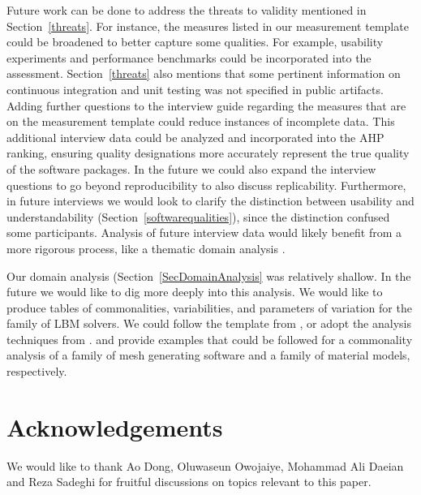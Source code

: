 \documentclass[final, 3p, times, authoryear]{elsarticle}
\begin{document}
Future work can be done to address the threats to validity mentioned in
Section~\ref{threats}.  For instance, the measures listed in our measurement
template could be broadened to better capture some qualities. For example,
usability experiments and performance benchmarks could be incorporated into the
assessment.  Section~\ref{threats} also mentions that some pertinent information
on continuous integration and unit testing was not specified in public
artifacts. Adding further questions to the interview guide regarding the
measures that are on the measurement template could reduce instances of
incomplete data. This additional interview data could be analyzed and
incorporated into the AHP ranking, ensuring quality designations more accurately
represent the true quality of the software packages. In the future we could also
expand the interview questions to go beyond reproducibility to also discuss
replicability. Furthermore, in future interviews we would look to clarify the
distinction between usability and understandability
(Section~\ref{softwarequalities}), since the distinction confused some
participants.  Analysis of future interview data would likely benefit from a
more rigorous process, like a thematic domain analysis \citep{JungEtAl2022}.

Our domain analysis (Section~\ref{SecDomainAnalysis} was relatively shallow.  In
the future we would like to dig more deeply into this analysis.  We would like
to produce tables of commonalities, variabilities, and parameters of variation
for the family of LBM solvers. We could follow the template from
\citep{smith2008commonality}, or adopt the analysis techniques from
\citep{weiss1998commonality}. \cite{SmithAndChen2004} and
\cite{SmithMcCutchanAndCarette2017} provide examples that could be followed for
a commonality analysis of a family of mesh generating software and a family of
material models, respectively.

\section*{Acknowledgements}

We would like to thank Ao Dong, Oluwaseun Owojaiye, Mohammad Ali Daeian and Reza
Sadeghi for fruitful discussions on topics relevant to this paper.



\end{document}
